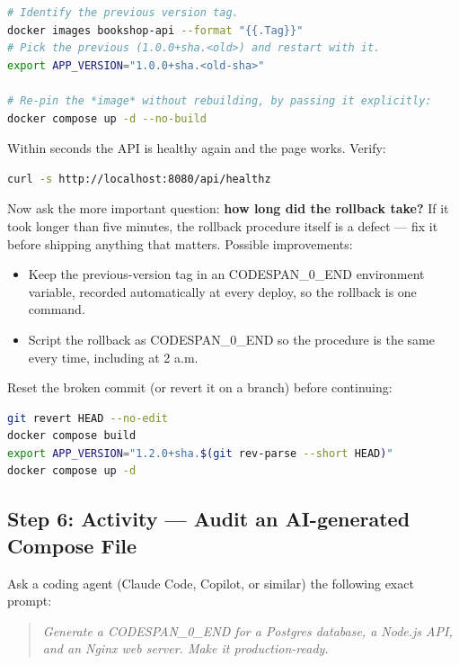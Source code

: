 \documentclass[11pt,a4paper]{book}
\begin{document}
\begin{lstlisting}[language=Bash]
# Identify the previous version tag.
docker images bookshop-api --format "{{.Tag}}"
# Pick the previous (1.0.0+sha.<old>) and restart with it.
export APP_VERSION="1.0.0+sha.<old-sha>"

# Re-pin the *image* without rebuilding, by passing it explicitly:
docker compose up -d --no-build
\end{lstlisting}

Within seconds the API is healthy again and the page works. Verify:

\begin{lstlisting}[language=Bash]
curl -s http://localhost:8080/api/healthz
\end{lstlisting}

Now ask the more important question: \textbf{how long did the rollback take?} If it took longer than five minutes, the rollback procedure itself is a defect --- fix it before shipping anything that matters. Possible improvements:

\begin{itemize}
  \item Keep the previous-version tag in an CODESPAN\_0\_END environment variable, recorded automatically at every deploy, so the rollback is one command.
  \item Script the rollback as CODESPAN\_0\_END so the procedure is the same every time, including at 2 a.m.
\end{itemize}

Reset the broken commit (or revert it on a branch) before continuing:

\begin{lstlisting}[language=Bash]
git revert HEAD --no-edit
docker compose build
export APP_VERSION="1.2.0+sha.$(git rev-parse --short HEAD)"
docker compose up -d
\end{lstlisting}

\medskip

\subsection{Step 6: Activity --- Audit an AI-generated Compose File}

Ask a coding agent (Claude Code, Copilot, or similar) the following exact prompt:

\begin{quote}
\textit{Generate a CODESPAN\_0\_END for a Postgres database, a Node.js API, and an Nginx web server. Make it production-ready.}
\end{quote}
\end{document}
